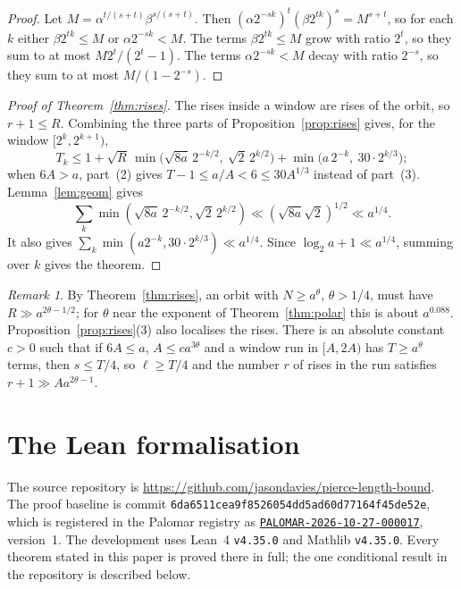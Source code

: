 \documentclass[11pt]{article}
\theoremstyle{definition}
\theoremstyle{remark}
\newtheorem{remark}[theorem]{Remark}
\newcommand{\lean}[1]{\nolinkurl{#1}}
\begin{document}
\begin{proof}
Let $M=\alpha^{t/(s+t)}\beta^{s/(s+t)}$. Then $(\alpha2^{-sk})^t(\beta2^{tk})^s=M^{s+t}$, so for each
$k$ either $\beta2^{tk}\le M$ or $\alpha2^{-sk}<M$. The terms $\beta2^{tk}\le M$ grow with ratio
$2^t$, so they sum to at most $M2^t/(2^t-1)$. The terms $\alpha2^{-sk}<M$ decay with ratio $2^{-s}$,
so they sum to at most $M/(1-2^{-s})$.
\end{proof}

\begin{proof}[Proof of Theorem~\ref{thm:rises}]
The rises inside a window are rises of the orbit, so $r+1\le R$. Combining the three parts
of Proposition~\ref{prop:rises} gives, for the window $[2^k,2^{k+1})$,
\[
T_k\le 1+\sqrt R\,\min\bigl(\sqrt{8a}\,2^{-k/2},\ \sqrt2\,2^{k/2}\bigr)
+\min\bigl(a\,2^{-k},\ 30\cdot2^{k/3}\bigr);
\]
when $6A>a$, part~(2) gives $T-1\le a/A<6\le30A^{1/3}$ instead of part~(3).
Lemma~\ref{lem:geom} gives
\[
 \sum_k\min(\sqrt{8a}\,2^{-k/2},\sqrt2\,2^{k/2})\ll(\sqrt{8a}\sqrt2)^{1/2}\ll a^{1/4}.
\]
It also gives
$\sum_k\min(a2^{-k},30\cdot2^{k/3})\ll a^{1/4}$. Since $\log_2a+1\ll a^{1/4}$, summing over $k$
gives the theorem.
\end{proof}

\begin{remark}
By Theorem~\ref{thm:rises}, an orbit with $N\ge a^\theta$, $\theta>1/4$, must have
$R\gg a^{2\theta-1/2}$; for $\theta$ near the exponent of Theorem~\ref{thm:polar} this is
about $a^{0.088}$. Proposition~\ref{prop:rises}(3) also localises the rises. There is an
absolute constant $c>0$ such that if $6A\le a$, $A\le ca^{3\theta}$ and a window run in
$[A,2A)$ has $T\ge a^\theta$ terms, then $s\le T/4$, so $\ell\ge T/4$ and the number $r$ of
rises in the run satisfies $r+1\gg Aa^{2\theta-1}$.
\end{remark}

\section{The Lean formalisation}\label{sec:lean}

The source repository is
\url{https://github.com/jasondavies/pierce-length-bound}.
The proof baseline is commit
\lean{6da6511cea9f8526054dd5ad60d77164f45de52e},
which is registered in the Palomar registry as
\href{https://palomar-registry.org/entry?id=PALOMAR-2026-10-27-000017&version=1}{\lean{PALOMAR-2026-10-27-000017}},
version~1.
The development uses Lean~4 \lean{v4.35.0} and Mathlib \lean{v4.35.0}.
Every theorem stated in this paper is proved there in full; the one
conditional result in the repository is described below.
\end{document}

